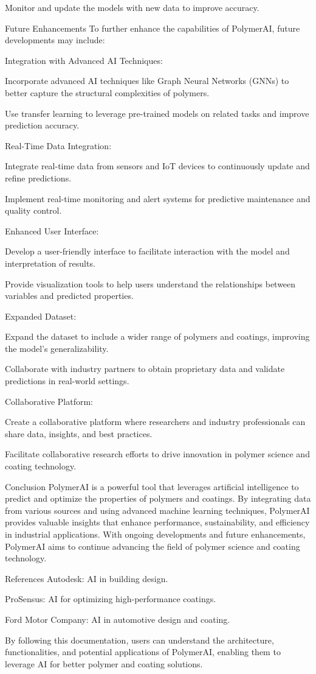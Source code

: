 \documentclass{article}
\begin{document}
	Monitor and update the models with new data to improve accuracy.
	
	Future Enhancements
	To further enhance the capabilities of PolymerAI, future developments may include:
	
	Integration with Advanced AI Techniques:
	
	Incorporate advanced AI techniques like Graph Neural Networks (GNNs) to better capture the structural complexities of polymers.
	
	Use transfer learning to leverage pre-trained models on related tasks and improve prediction accuracy.
	
	Real-Time Data Integration:
	
	Integrate real-time data from sensors and IoT devices to continuously update and refine predictions.
	
	Implement real-time monitoring and alert systems for predictive maintenance and quality control.
	
	Enhanced User Interface:
	
	Develop a user-friendly interface to facilitate interaction with the model and interpretation of results.
	
	Provide visualization tools to help users understand the relationships between variables and predicted properties.
	
	Expanded Dataset:
	
	Expand the dataset to include a wider range of polymers and coatings, improving the model’s generalizability.
	
	Collaborate with industry partners to obtain proprietary data and validate predictions in real-world settings.
	
	Collaborative Platform:
	
	Create a collaborative platform where researchers and industry professionals can share data, insights, and best practices.
	
	Facilitate collaborative research efforts to drive innovation in polymer science and coating technology.
	
	Conclusion
	PolymerAI is a powerful tool that leverages artificial intelligence to predict and optimize the properties of polymers and coatings. By integrating data from various sources and using advanced machine learning techniques, PolymerAI provides valuable insights that enhance performance, sustainability, and efficiency in industrial applications. With ongoing developments and future enhancements, PolymerAI aims to continue advancing the field of polymer science and coating technology.
	
	References
	Autodesk: AI in building design.
	
	ProSensus: AI for optimizing high-performance coatings.
	
	Ford Motor Company: AI in automotive design and coating.
	
	By following this documentation, users can understand the architecture, functionalities, and potential applications of PolymerAI, enabling them to leverage AI for better polymer and coating solutions.
\end{document}
